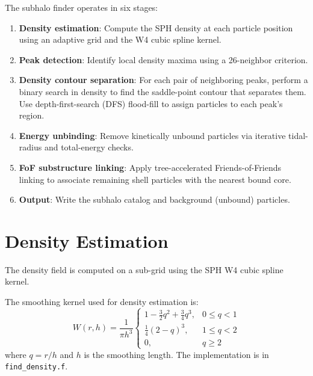 \documentclass[11pt,fleqn]{book}
\newcommand{\file}[1]{\texttt{#1}}
\begin{document}
\begin{algorithm}
The subhalo finder operates in six stages:
\begin{enumerate}[leftmargin=2em]
  \item \textbf{Density estimation}: Compute the SPH density at each particle position using an adaptive grid and the W4 cubic spline kernel.
  \item \textbf{Peak detection}: Identify local density maxima using a 26-neighbor criterion.
  \item \textbf{Density contour separation}: For each pair of neighboring peaks, perform a binary search in density to find the saddle-point contour that separates them.  Use depth-first-search (DFS) flood-fill to assign particles to each peak's region.
  \item \textbf{Energy unbinding}: Remove kinetically unbound particles via iterative tidal-radius and total-energy checks.
  \item \textbf{FoF substructure linking}: Apply tree-accelerated Friends-of-Friends linking to associate remaining shell particles with the nearest bound core.
  \item \textbf{Output}: Write the subhalo catalog and background (unbound) particles.
\end{enumerate}
\end{algorithm}

\section{Density Estimation}

The density field is computed on a sub-grid using the SPH W4 cubic spline kernel.

\begin{definition}
The smoothing kernel used for density estimation is:
\begin{equation}
  W(r,h) = \frac{1}{\pi h^3} \begin{cases}
    1 - \tfrac{3}{2}q^2 + \tfrac{3}{4}q^3, & 0 \le q < 1 \\[4pt]
    \tfrac{1}{4}(2-q)^3, & 1 \le q < 2 \\[4pt]
    0, & q \ge 2
  \end{cases}
\end{equation}
where $q = r/h$ and $h$ is the smoothing length.  The implementation is in \file{find\_density.f}.
\end{definition}
\end{document}
